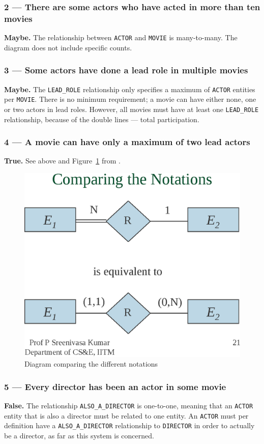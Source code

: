 \subsubsection{2 --- There are some actors who have acted in more than ten movies}
\textbf{Maybe.} The relationship between \texttt{ACTOR} and \texttt{MOVIE} is
many-to-many.  The diagram does not include specific counts.

\subsubsection{3 --- Some actors have done a lead role in multiple movies}
\textbf{Maybe.} The \texttt{LEAD\_ROLE} relationship only specifies a maximum
of \texttt{ACTOR} entities per \texttt{MOVIE}.  There is no minimum
requirement; a movie can have either none, one or two actors in lead roles.
However, all movies must have at least one \texttt{LEAD\_ROLE} relationship,
because of the double lines --- total participation. 


\subsubsection{4 --- A movie can have only a maximum of two lead actors}
\textbf{True.} See above and Figure~\ref{fig:cse_slides_21}
from \cite{2dv513:cse_slides_21}.


\begin{figure}[htbp]
  \centering
  \includegraphics[width=0.6\linewidth]{include/cse_slides_21.eps}
    \caption{Diagram comparing the different notations
             \cite{2dv513:cse_slides_21}}
  \label{fig:cse_slides_21}
\end{figure}


\subsubsection{5 --- Every director has been an actor in some movie}
\textbf{False.} The relationship \texttt{ALSO\_A\_DIRECTOR} is one-to-one,
meaning that an \texttt{ACTOR} entity that is also a director must be
related to one  entity.
An \texttt{ACTOR} must per definition have a \texttt{ALSO\_A\_DIRECTOR}
relationship to \texttt{DIRECTOR} in order to actually be a director,
as far as this system is concerned.

